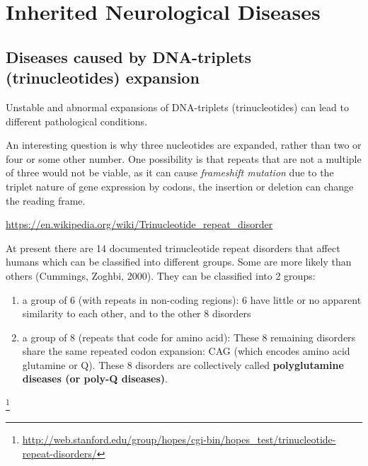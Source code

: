\chapter{Inherited Neurological Diseases}
\label{chap:Inherited-Neurological-Diseases}


\section{Diseases caused by DNA-triplets (trinucleotides) expansion}
\label{sec:trinucleotide-expansion}

Unstable and abnormal expansions of DNA-triplets (trinucleotides) can lead to
different pathological conditions.

\begin{mdframed}

An interesting question is why three nucleotides are expanded, rather than two
or four or some other number.
One possibility is that repeats that are not a multiple of three would not be
viable, as it can cause {\it frameshift mutation} due to the triplet nature of
gene expression by codons, the insertion or deletion can change the reading
frame.

\url{https://en.wikipedia.org/wiki/Trinucleotide_repeat_disorder}
\end{mdframed}


At present there are 14 documented trinucleotide repeat disorders that affect
humans which can be classified into different groups. Some are more likely than
others (Cummings, Zoghbi, 2000). They can be classified into 2 groups:
\begin{enumerate}
  \item a group of 6 (with repeats in non-coding regions): 6 have little or no
  apparent similarity to each other, and to the other 8 disorders
  
  \item a group of 8 (repeats that code for amino acid):  These 8 remaining
  disorders share the same repeated codon expansion: CAG (which encodes amino
  acid glutamine or Q). These 8 disorders are collectively called {\bf
  polyglutamine diseases (or poly-Q diseases)}.
  
\end{enumerate}
\footnote{\url{http://web.stanford.edu/group/hopes/cgi-bin/hopes_test/trinucleotide-repeat-disorders/}}

